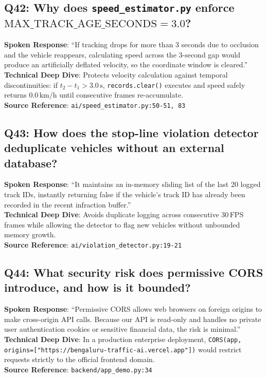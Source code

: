 \subsection*{Q42: Why does \texttt{speed\_estimator.py} enforce $\text{MAX\_TRACK\_AGE\_SECONDS} = 3.0$?}
\begin{interviewbox}
\textbf{Spoken Response}: ``If tracking drops for more than 3 seconds due to occlusion and the vehicle reappears, calculating speed across the 3-second gap would produce an artificially deflated velocity, so the coordinate window is cleared.''\\
\textbf{Technical Deep Dive}: Protects velocity calculation against temporal discontinuities: if $t_2 - t_1 > 3.0\,\text{s}$, \texttt{records.clear()} executes and speed safely returns $0.0\,\text{km/h}$ until consecutive frames re-accumulate.\\
\textbf{Source Reference}: \texttt{ai/speed\_estimator.py:50-51, 83}
\end{interviewbox}

\subsection*{Q43: How does the stop-line violation detector deduplicate vehicles without an external database?}
\begin{interviewbox}
\textbf{Spoken Response}: ``It maintains an in-memory sliding list of the last 20 logged track IDs, instantly returning false if the vehicle's track ID has already been recorded in the recent infraction buffer.''\\
\textbf{Technical Deep Dive}: Avoids duplicate logging across consecutive 30\,FPS frames while allowing the detector to flag new vehicles without unbounded memory growth.\\
\textbf{Source Reference}: \texttt{ai/violation\_detector.py:19-21}
\end{interviewbox}

\subsection*{Q44: What security risk does permissive CORS introduce, and how is it bounded?}
\begin{interviewbox}
\textbf{Spoken Response}: ``Permissive CORS allows web browsers on foreign origins to make cross-origin API calls. Because our API is read-only and handles no private user authentication cookies or sensitive financial data, the risk is minimal.''\\
\textbf{Technical Deep Dive}: In a production enterprise deployment, \texttt{CORS(app, origins=["https://bengaluru-traffic-ai.vercel.app"])} would restrict requests strictly to the official frontend domain.\\
\textbf{Source Reference}: \texttt{backend/app\_demo.py:34}
\end{interviewbox}

